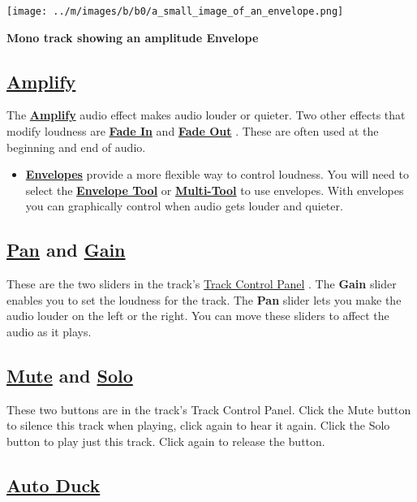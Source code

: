 \documentclass[]{book}
\begin{document}
\begin{multicols}{2}
\par\texttt{[image: ../m/images/b/b0/a\_small\_image\_of\_an\_envelope.png]}\par\textbf{Mono track showing an amplitude Envelope}

\subsection{
\hyperref[amplify_]{Amplify}
}


The \textbf{
\hyperref[amplify_]{Amplify}
} audio effect makes audio louder or quieter.  Two other effects that modify loudness are \textbf{
\hyperref[fades__linearfade]{Fade In}
} and \textbf{
\hyperref[fades__linearfade]{Fade Out}
}.  These are often used at the beginning and end of audio. 
\begin{itemize}
\item  \textbf{
\hyperref[envelope_tool_]{Envelopes}
} provide a more flexible way to control loudness.  You will need to select the \textbf{
\hyperref[envelope_tool_]{Envelope Tool}
} or \textbf{
\hyperref[multi_tool_]{Multi-Tool}
} to use envelopes.  With envelopes you can graphically control when audio gets louder and quieter.
\end{itemize}

\subsection{
\hyperref[audio_tracks__pan]{Pan}
 and 
\hyperref[audio_tracks__gain]{Gain}
}


These are the two sliders in the track's 
\hyperref[audio_tracks__panel]{Track Control Panel}
. The \textbf{Gain} slider enables you to set the loudness for the track.  The \textbf{Pan} slider lets you make the audio louder on the left or the right. You can move these sliders to affect the audio as it plays.

\subsection{
\hyperref[audio_tracks__mute]{Mute}
 and 
\hyperref[audio_tracks__solo]{Solo}
}


These two buttons are in the track's Track Control Panel. Click the Mute button to silence this track when playing, click again to hear it again. Click the Solo button to play just this track. Click again to release the button. 

\subsection{
\hyperref[auto_duck_]{Auto Duck}
}



\end{multicols}
\end{document}
